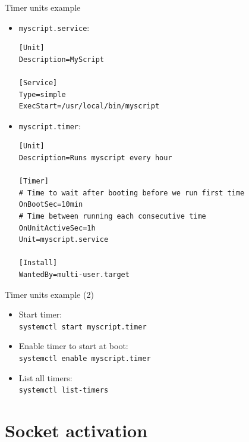 \documentclass[11pt,final,usepdftitle=false]{beamer}
\begin{document}
\begin{frame}[fragile]{Timer units example}
\begin{itemize}
\item \texttt{myscript.service}:
\begin{lstlisting}[basicstyle=\ttfamily\footnotesize,escapeinside={||}]
[Unit]
Description=MyScript

[Service]
Type=simple
ExecStart=/usr/local/bin/myscript
\end{lstlisting}
\item \texttt{myscript.timer}:
\begin{lstlisting}[basicstyle=\ttfamily\footnotesize,escapeinside={||}]
[Unit]
Description=Runs myscript every hour

[Timer]
# Time to wait after booting before we run first time
OnBootSec=10min
# Time between running each consecutive time
OnUnitActiveSec=1h
Unit=myscript.service

[Install]
WantedBy=multi-user.target
\end{lstlisting}
\end{itemize}
\end{frame}
\begin{frame}{Timer units example (2)}
	\begin{itemize}
\item Start timer:\\ \texttt{systemctl start myscript.timer}
	\hbr
\item Enable timer to start at boot:\\
	\texttt{systemctl enable myscript.timer}
\hbr
\item List all timers:\\ \texttt{systemctl list-timers}
\end{itemize}
\end{frame}

\section{Socket activation}
\end{document}
